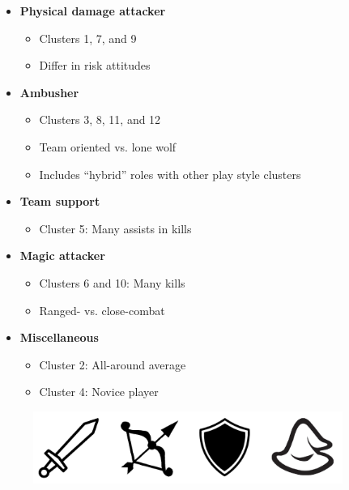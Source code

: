 \documentclass[a0]{a0poster}
\begin{document}
\begin{textblock}{7.0}
\begin{itemize}
\begin{multicols}{2}
\begin{itemize}
      \item \textbf{Physical damage attacker}
      \begin{itemize}
        \item Clusters 1, 7, and 9
        \item Differ in risk attitudes
      \end{itemize}
      
      \item \textbf{Ambusher}
      \begin{itemize}
        \item Clusters 3, 8, 11, and 12
        \item Team oriented vs. lone wolf
        \item Includes ``hybrid'' roles with other play style clusters
      \end{itemize}
      
      \item \textbf{Team support}
      \begin{itemize}
        \item Cluster 5: Many assists in kills
      \end{itemize}
      
      \item \textbf{Magic attacker}
      \begin{itemize}
        \item Clusters 6 and 10: Many kills
        \item Ranged- vs. close-combat
      \end{itemize}
      
      \item \textbf{Miscellaneous}
      \begin{itemize}
        \item Cluster 2: All-around average
        \item Cluster 4: Novice player
      \end{itemize}

    \end{itemize}

  \end{multicols}

\end{itemize}

\begin{figure}[!h]
  \centering
  \includegraphics[width=0.9\textwidth]{clusters-intuit.pdf}
  \label{fig:intuit}
\end{figure}

\end{textblock}
\end{document}

